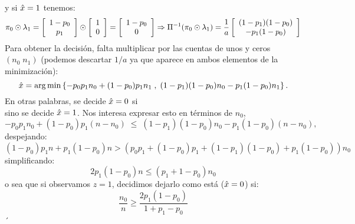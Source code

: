 \documentclass{article}
\begin{document}
y si $\hat{x}=1$ tenemos:
\[
\pi_0 \odot \lambda_1=\left[
\begin{array}{c}
1-p_0 \\
p_1   
\end{array}
\right] \odot
\left[
\begin{array}{c}
1 \\
0   
\end{array}
\right] = \left[
\begin{array}{c}
1-p_0 \\
0   
\end{array}
\right]
\Rightarrow
\Pi^{-1}(\pi_0 \odot \lambda_1) = \frac{1}{a}
\left[
\begin{array}{c}
(1-p_1)(1-p_0) \\
-p_1(1-p_0)
\end{array}
\right]
\]
Para obtener la decisión, falta multiplicar por las cuentas de unos y ceros $(n_0\;n_1)$ (podemos descartar $1/a$ ya que aparece en ambos elementos de la minimización):
\[
\hat{x} = \arg\min \left\{
-p_0p_1n_0 + (1-p_0)p_1n_1\;,\;(1-p_1)(1-p_0)n_0 - p_1(1-p_0)n_1
\right\}.
\]
En otras palabras, se decide $\hat{x}=0$ si
$$
$$
sino se decide $\hat{x}=1$. Nos interesa expresar esto en términos de $n_0$,
$$
-p_0p_1n_0 + (1-p_0)p_1(n-n_0)\;\leq\;(1-p_1)(1-p_0)n_0 - p_1(1-p_0)(n-n_0),
$$
despejando:
$$
(1-p_0)p_1n + p_1(1-p_0)n > (p_0p_1 + (1-p_0)p_1 + (1-p_1)(1-p_0) + p_1(1-p_0))n_0
$$
simplificando:
$$
2p_1(1-p_0)n \leq (p_1 + 1-p_0)n_0
$$
o sea que si observamos $z=1$, decidimos dejarlo como está ($\hat{x}=0$) si:
$$\frac{n_0}{n} \geq \frac{2p_1(1-p_0)}{1 + p_1 - p_0}$$
´
\end{document}
